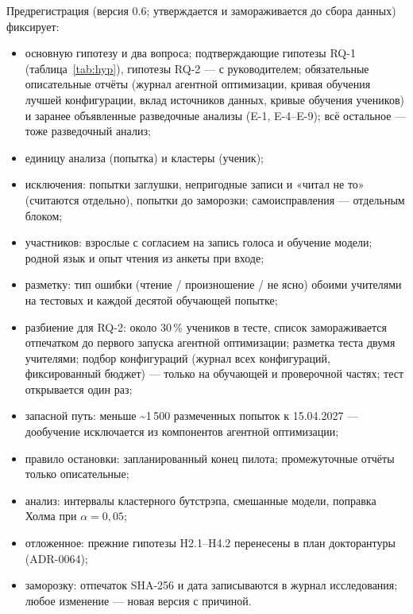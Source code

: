 Предрегистрация (версия 0.6; утверждается и замораживается до сбора данных) фиксирует:
\begin{itemize}
  \item основную гипотезу и два вопроса; подтверждающие гипотезы RQ-1 (таблица~\ref{tab:hyp}), гипотезы RQ-2 --- с руководителем; обязательные описательные отчёты (журнал агентной оптимизации, кривая обучения лучшей конфигурации, вклад источников данных, кривые обучения учеников) и заранее объявленные разведочные
    анализы (E-1, E-4--E-9); всё остальное --- тоже разведочный анализ;
  \item единицу анализа (попытка) и кластеры (ученик);
  \item исключения: попытки заглушки, непригодные записи и «читал не то» (считаются отдельно), попытки до
    заморозки; самоисправления --- отдельным блоком;
  \item участников: взрослые с согласием на запись голоса и обучение модели; родной язык и опыт
    чтения из анкеты при входе;
  \item разметку: тип ошибки (чтение / произношение / не ясно) обоими учителями на тестовых и каждой десятой
    обучающей попытке;
  \item разбиение для RQ-2: около 30\,\% учеников в тесте, список замораживается отпечатком до первого запуска агентной оптимизации; разметка теста двумя учителями; подбор конфигураций (журнал всех конфигураций, фиксированный бюджет) --- только на обучающей и проверочной частях; тест
    открывается один раз;
  \item запасной путь: меньше \textasciitilde1\,500 размеченных попыток к 15.04.2027 --- дообучение исключается
    из компонентов агентной оптимизации;
  \item правило остановки: запланированный конец пилота; промежуточные отчёты только описательные;
  \item анализ: интервалы кластерного бутстрэпа, смешанные модели, поправка Холма при $\alpha=0{,}05$;
  \item отложенное: прежние гипотезы H2.1--H4.2 перенесены в план докторантуры (ADR-0064);
  \item заморозку: отпечаток SHA-256 и дата записываются в журнал исследования; любое изменение --- новая
    версия с причиной.
\end{itemize}
